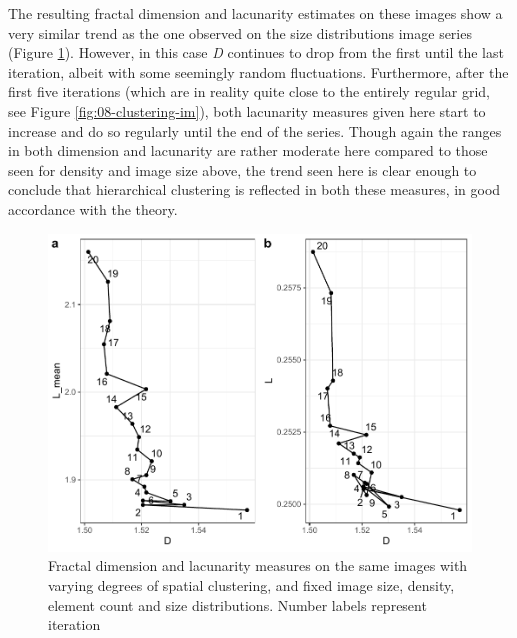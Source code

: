 \documentclass[
  12pt,
  a4paper, twoside]{book}
\begin{document}
The resulting fractal dimension and lacunarity estimates on these images show a very similar trend as the one observed on the size distributions image series (Figure \ref{fig:08-clustering}). However, in this case \emph{D} continues to drop from the first until the last iteration, albeit with some seemingly random fluctuations. Furthermore, after the first five iterations (which are in reality quite close to the entirely regular grid, see Figure \ref{fig:08-clustering-im}), both lacunarity measures given here start to increase and do so regularly until the end of the series. Though again the ranges in both dimension and lacunarity are rather moderate here compared to those seen for density and image size above, the trend seen here is clear enough to conclude that hierarchical clustering is reflected in both these measures, in good accordance with the theory.



\begin{figure}

{\centering \includegraphics[width=0.9\linewidth]{bookdown-demo_files/figure-latex/08-clustering-1} 

}

\caption[D and L estimates, variable degrees of clustering]{Fractal dimension and lacunarity measures on the same images with varying degrees of spatial clustering, and fixed image size, density, element count and size distributions. Number labels represent iteration}\label{fig:08-clustering}
\end{figure}
\end{document}
